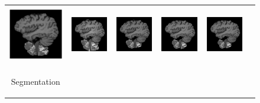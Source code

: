 \documentclass[review]{elsarticle}
\begin{document}
\begin{figure}[H]
\begin{raggedleft}
\begin{tabular}{cccccc}
			\includegraphics[width=2.5cm,height=2.5cm]{include/grp2/factor2/019-Guys-0702-T1/019-Guys-0702-T1_brains__78} &
			\includegraphics[width=2.5cm,height=2.5cm]{include/grp2/factor2/019-Guys-0702-T1/019-Guys-0702-T1_brains__zeroPadding_78} & \includegraphics[width=2.5cm,height=2.5cm]{include/grp2/factor2/019-Guys-0702-T1/019-Guys-0702-T1_brains__CS_78} & \includegraphics[width=2.5cm,height=2.5cm]{include/grp2/factor2/019-Guys-0702-T1/019-Guys-0702-T1_brains__IMCNNL2TUNE_78} & \includegraphics[width=2.5cm,height=2.5cm]{include/grp2/factor2/019-Guys-0702-T1/019-Guys-0702-T1_brains__predict_78}
			
			\tabularnewline
			
			\multirow{2}{0.05cm}[1.7cm]{\begin{turn}{90} {\footnotesize Segmentation} \end{turn}} &
			

\end{tabular}
\end{raggedleft}
\end{figure}
\end{document}
